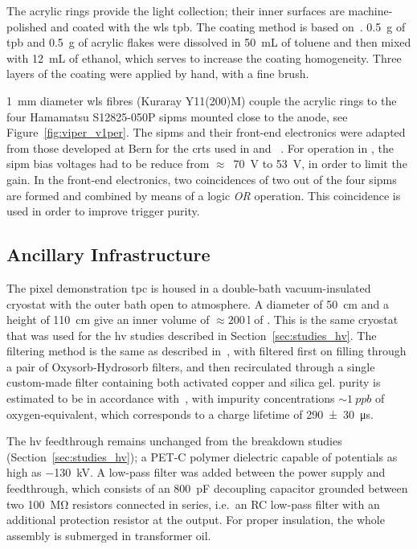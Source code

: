 The acrylic rings provide the light collection; their inner surfaces are machine-polished and coated with the \gls{wls} \gls{tpb}. 
The coating method is based on~\cite{TPBcoating}.
\SI{0.5}{\gram} of \gls{tpb} and \SI{0.5}{\gram} of acrylic flakes were dissolved in \SI{50}{\milli\liter} of toluene and then mixed with \SI{12}{\milli\liter} of ethanol, which serves to increase the coating homogeneity. 
Three layers of the coating were applied by hand, with a fine brush. 

\SI{1}{\milli\metre} diameter \gls{wls} fibres (Kuraray Y11(200)M) couple the acrylic rings to the four Hamamatsu S12825-050P \glspl{sipm} mounted close to the anode, see Figure~\ref{fig:viper_v1per}. 
The \glspl{sipm} and their front-end electronics were adapted from those developed at Bern for the \glspl{crt} used in \uboone{} and \sbnd{}~\cite{crt, crt_feb}.
For operation in \lar{}, the \gls{sipm} bias voltages had to be reduce from $\approx$~\SI{70}{\volt} to \SI{53}{\volt}, in order to limit the gain.   
In the front-end electronics, two coincidences of two out of the four \glspl{sipm} are formed and combined by means of a logic \textit{OR} operation. 
This coincidence is used in order to improve trigger purity.


\subsection{Ancillary Infrastructure}
\label{sec:ac_viper_infrastructure}

The pixel demonstration \gls{tpc} is housed in a double-bath vacuum-insulated cryostat with the outer bath open to atmosphere.
A diameter of \SI{50}{\centi\metre} and a height of \SI{110}{\centi\metre} give an inner volume of $\approx \SI{200}{\litre}$ of \lar{}.
This is the same cryostat that was used for the \gls{hv} studies described in Section~\ref{sec:studies_hv}.
The \lar{} filtering method is the same as described in~\cite{2photonAbs}, with \lar{} filtered first on filling through a pair of Oxysorb-Hydrosorb filters, and then recirculated through a single custom-made filter containing both activated copper and silica gel.
\lar{} purity is estimated to be in accordance with~\cite{2photonAbs}, with impurity concentrations $\sim{\SI{1}{ppb}}$ of oxygen-equivalent, which corresponds to a charge lifetime of \SI{290+-30}{\micro\second}.

The \gls{hv} feedthrough remains unchanged from the breakdown studies (Section~\ref{sec:studies_hv}); a PET-C polymer dielectric capable of potentials as high as \SI{-130}{\kilo\volt}.
A low-pass filter was added between the power supply and feedthrough, which consists of an \SI{800}{\pico\farad} decoupling capacitor grounded between two \SI{100}{\mega\ohm} resistors connected in series, i.e.\ an RC low-pass filter with an additional protection resistor at the output.
For proper insulation, the whole assembly is submerged in transformer oil.


